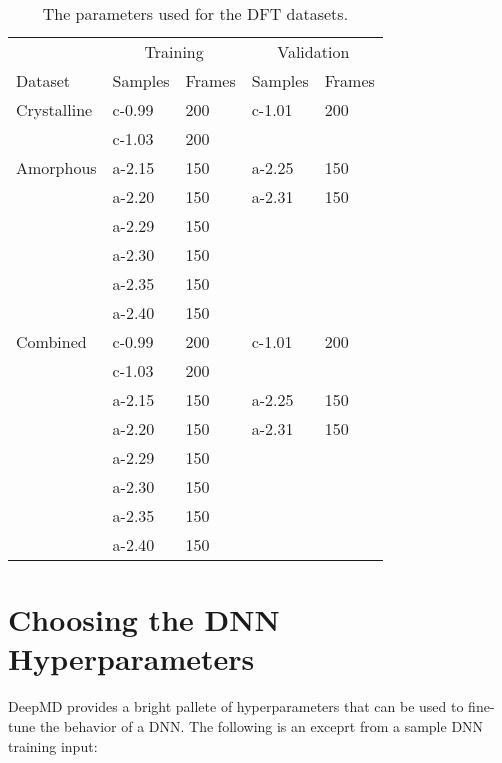 %
%

\begin{table}
  \begin{tabularx}{\textwidth}{lllll}
    \toprule
    \multicolumn{1}{c}{} & \multicolumn{2}{c}{Training} & \multicolumn{2}{c}{Validation} \\
    Dataset & Samples & Frames & Samples & Frames \\
    \midrule
    Crystalline & c-0.99 & 200 & c-1.01 & 200 \\
     & c-1.03 & 200 & & \\
    \midrule
    Amorphous & a-2.15 & 150 & a-2.25 & 150 \\
     & a-2.20 & 150 & a-2.31 & 150 \\
     & a-2.29 & 150 & & \\
     & a-2.30 & 150 & & \\
     & a-2.35 & 150 & & \\
     & a-2.40 & 150 & & \\
    \midrule
    Combined & c-0.99 & 200 & c-1.01 & 200 \\
     & c-1.03 & 200 & & \\
     & a-2.15 & 150 & a-2.25 & 150 \\
     & a-2.20 & 150 & a-2.31 & 150 \\
     & a-2.29 & 150 & & \\
     & a-2.30 & 150 & & \\
     & a-2.35 & 150 & & \\
     & a-2.40 & 150 & & \\
    \bottomrule
  \end{tabularx}
  \caption{The parameters used for the DFT datasets.}
  \label{tab:datasets}
\end{table}

\section{Choosing the DNN Hyperparameters}

DeepMD provides a bright pallete of hyperparameters that can be used to
fine-tune the behavior of a DNN. The following is an exceprt from a sample DNN
training input:

